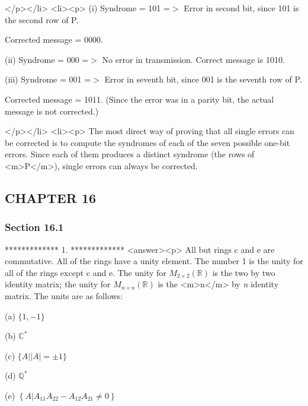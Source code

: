 </p></li>
<li><p> (i)  Syndrome = 101 =$>$ Error in second bit, since 101 is the second row of P. 



Corrected message = 0000. 



      (ii) Syndrome = 000 =$>$ No error in transmission. Correct message is 1010.



      (iii) Syndrome = 001 =$>$ Error in seventh bit, since 001 is the seventh row of P.



Corrected message = 1011. (Since the error was in a parity bit, the actual message is not corrected.)

</p></li>
<li><p> The most direct way of proving that all single errors can be corrected is to compute the syndromes of each of the seven possible one-bit errors.
Since each of them produces a distinct syndrome (the rows of <m>P</m>), single errors can always be corrected.


\subsection{CHAPTER 16}


\subsubsection{Section 16.1}

*************
1.
*************
<answer><p> All but rings c and e are commutative. All of the rings have a unity element. The number 1 is the unity for all of the rings except c and e. The
unity for \(M_{2\times 2}(\mathbb{R})\) is the two by two identity matrix; the unity for \(M_{n\times n}(\mathbb{R})\) is the <m>n</m> by \textit{
n }identity matrix. The units are as follows:



(a)  \(\{1, -1\}\)$\quad \quad \quad \quad $



(b)   \(\mathbb{C}^*\) 



(c)  \(\{A | \left| A\right| =\pm 1\}\)



(d)   \(\mathbb{Q}^*\) 



(e)   \(\left\{A \left| A_{11}A_{22}-A_{12}A_{21}\neq 0\right.\right\}\)



